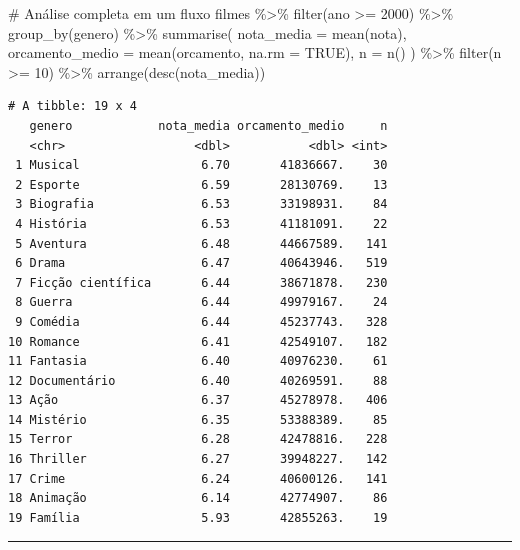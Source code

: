\documentclass[
  letterpaper,
]{scrbook}
\newenvironment{Shaded}{\begin{snugshade}}{\end{snugshade}}
\newcommand{\AttributeTok}[1]{\textcolor[rgb]{0.40,0.45,0.13}{#1}}
\newcommand{\CommentTok}[1]{\textcolor[rgb]{0.37,0.37,0.37}{#1}}
\newcommand{\ConstantTok}[1]{\textcolor[rgb]{0.56,0.35,0.01}{#1}}
\newcommand{\DecValTok}[1]{\textcolor[rgb]{0.68,0.00,0.00}{#1}}
\newcommand{\FunctionTok}[1]{\textcolor[rgb]{0.28,0.35,0.67}{#1}}
\newcommand{\NormalTok}[1]{\textcolor[rgb]{0.00,0.23,0.31}{#1}}
\newcommand{\SpecialCharTok}[1]{\textcolor[rgb]{0.37,0.37,0.37}{#1}}
\begin{document}
\begin{Shaded}
\begin{Highlighting}[]
\CommentTok{\# Análise completa em um fluxo}
\NormalTok{filmes }\SpecialCharTok{\%\textgreater{}\%}
  \FunctionTok{filter}\NormalTok{(ano }\SpecialCharTok{\textgreater{}=} \DecValTok{2000}\NormalTok{) }\SpecialCharTok{\%\textgreater{}\%}
  \FunctionTok{group\_by}\NormalTok{(genero) }\SpecialCharTok{\%\textgreater{}\%}
  \FunctionTok{summarise}\NormalTok{(}
    \AttributeTok{nota\_media =} \FunctionTok{mean}\NormalTok{(nota),}
    \AttributeTok{orcamento\_medio =} \FunctionTok{mean}\NormalTok{(orcamento, }\AttributeTok{na.rm =} \ConstantTok{TRUE}\NormalTok{),}
    \AttributeTok{n =} \FunctionTok{n}\NormalTok{()}
\NormalTok{  ) }\SpecialCharTok{\%\textgreater{}\%}
  \FunctionTok{filter}\NormalTok{(n }\SpecialCharTok{\textgreater{}=} \DecValTok{10}\NormalTok{) }\SpecialCharTok{\%\textgreater{}\%}
  \FunctionTok{arrange}\NormalTok{(}\FunctionTok{desc}\NormalTok{(nota\_media))}
\end{Highlighting}
\end{Shaded}

\begin{verbatim}
# A tibble: 19 x 4
   genero            nota_media orcamento_medio     n
   <chr>                  <dbl>           <dbl> <int>
 1 Musical                 6.70       41836667.    30
 2 Esporte                 6.59       28130769.    13
 3 Biografia               6.53       33198931.    84
 4 História                6.53       41181091.    22
 5 Aventura                6.48       44667589.   141
 6 Drama                   6.47       40643946.   519
 7 Ficção científica       6.44       38671878.   230
 8 Guerra                  6.44       49979167.    24
 9 Comédia                 6.44       45237743.   328
10 Romance                 6.41       42549107.   182
11 Fantasia                6.40       40976230.    61
12 Documentário            6.40       40269591.    88
13 Ação                    6.37       45278978.   406
14 Mistério                6.35       53388389.    85
15 Terror                  6.28       42478816.   228
16 Thriller                6.27       39948227.   142
17 Crime                   6.24       40600126.   141
18 Animação                6.14       42774907.    86
19 Família                 5.93       42855263.    19
\end{verbatim}

\begin{center}\rule{0.5\linewidth}{0.5pt}\end{center}
\end{document}

